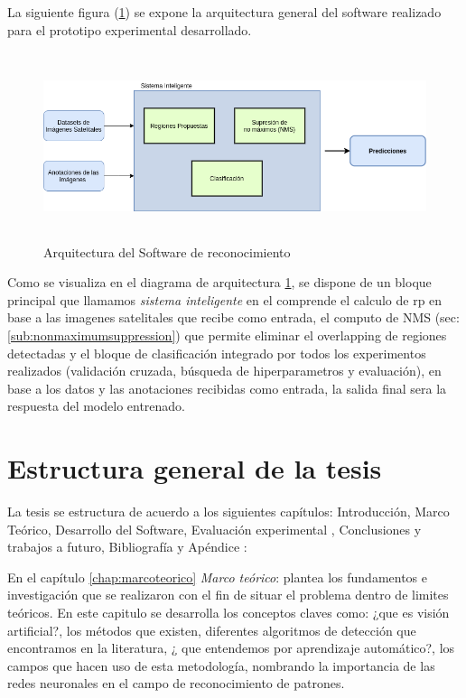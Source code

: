 La siguiente figura (\ref{Fig: diagbloque}) se expone la arquitectura general del software realizado para el prototipo experimental desarrollado. 

\begin{figure}[H]
 \centering
  \includegraphics[height=5.5cm,keepaspectratio=true,clip=true]{imagenes/Logos/DB-Sistema.png}
  \caption{Arquitectura del Software de reconocimiento}
	\label{Fig: diagbloque}
 \end{figure}
 
Como se visualiza en el diagrama de arquitectura \ref{Fig: diagbloque}, se dispone de un bloque principal que llamamos \textit{sistema inteligente} en el comprende el calculo de \ac{rp} en base a las imagenes satelitales que recibe como entrada, el computo de NMS (sec: \ref{sub:nonmaximumsuppression}) que permite eliminar el overlapping de regiones detectadas y el bloque de clasificación integrado por todos los experimentos realizados (validación cruzada, búsqueda de hiperparametros y evaluación), en base a los datos y las anotaciones recibidas como entrada, la salida final sera la respuesta del modelo entrenado.

\section{Estructura general de la tesis }\label{sec:estructura}


La tesis se estructura de acuerdo a los siguientes capítulos: Introducción, Marco Teórico, Desarrollo del Software, Evaluación experimental , Conclusiones y trabajos a futuro, Bibliografía y Apéndice :

En el capítulo \ref{chap:marcoteorico} \textit{Marco teórico}: plantea los fundamentos e investigación que se realizaron con el fin de situar el problema dentro de limites teóricos. En este capitulo se desarrolla los conceptos claves como: ¿que es visión artificial?, los métodos que existen, diferentes algoritmos de detección que encontramos en la literatura, ¿ que entendemos por aprendizaje automático?, los campos que hacen uso de esta metodología, nombrando la importancia de las redes neuronales en el campo de reconocimiento de patrones.

